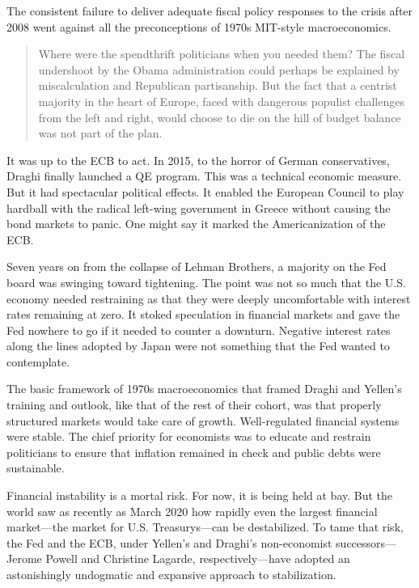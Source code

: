 \documentclass[
]{book}
\begin{document}
The consistent failure to deliver adequate fiscal policy responses to the crisis after 2008 went against all the preconceptions of 1970s MIT-style macroeconomics.

\begin{quote}
Where were the spendthrift politicians when you needed them? The fiscal undershoot by the Obama administration could perhaps be explained by miscalculation and Republican partisanship. But the fact that a centrist majority in the heart of Europe, faced with dangerous populist challenges from the left and right, would choose to die on the hill of budget balance was not part of the plan.
\end{quote}

It was up to the ECB to act. In 2015, to the horror of German conservatives, Draghi finally launched a QE program. This was a technical economic measure. But it had spectacular political effects. It enabled the European Council to play hardball with the radical left-wing government in Greece without causing the bond markets to panic.
One might say it marked the Americanization of the ECB.

Seven years on from the collapse of Lehman Brothers, a majority on the Fed board was swinging toward tightening. The point was not so much that the U.S. economy needed restraining as that they were deeply uncomfortable with interest rates remaining at zero. It stoked speculation in financial markets and gave the Fed nowhere to go if it needed to counter a downturn. Negative interest rates along the lines adopted by Japan were not something that the Fed wanted to contemplate.

The basic framework of 1970s macroeconomics that framed Draghi and Yellen's training and outlook, like that of the rest of their cohort, was that properly structured markets would take care of growth. Well-regulated financial systems were stable. The chief priority for economists was to educate and restrain politicians to ensure that inflation remained in check and public debts were sustainable.

Financial instability is a mortal risk. For now, it is being held at bay. But the world saw as recently as March 2020 how rapidly even the largest financial market---the market for U.S. Treasurys---can be destabilized. To tame that risk, the Fed and the ECB, under Yellen's and Draghi's non-economist successors---Jerome Powell and Christine Lagarde, respectively---have adopted an astonishingly undogmatic and expansive approach to stabilization.
\end{document}
